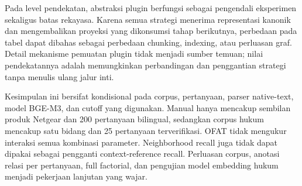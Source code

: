 Pada level pendekatan, abstraksi plugin berfungsi sebagai pengendali eksperimen sekaligus batas rekayasa. Karena semua strategi menerima representasi kanonik dan mengembalikan proyeksi yang dikonsumsi tahap berikutnya, perbedaan pada tabel dapat dibahas sebagai perbedaan chunking, indexing, atau perluasan graf. Detail mekanisme pemuatan plugin tidak menjadi sumber temuan; nilai pendekatannya adalah memungkinkan perbandingan dan penggantian strategi tanpa menulis ulang jalur inti.

Kesimpulan ini bersifat kondisional pada corpus, pertanyaan, parser native-text, model BGE-M3, dan cutoff yang digunakan. Manual hanya mencakup sembilan produk Netgear dan 200 pertanyaan bilingual, sedangkan corpus hukum mencakup satu bidang dan 25 pertanyaan terverifikasi. OFAT tidak mengukur interaksi semua kombinasi parameter. Neighborhood recall juga tidak dapat dipakai sebagai pengganti context-reference recall. Perluasan corpus, anotasi relasi per pertanyaan, full factorial, dan pengujian model embedding hukum menjadi pekerjaan lanjutan yang wajar.
